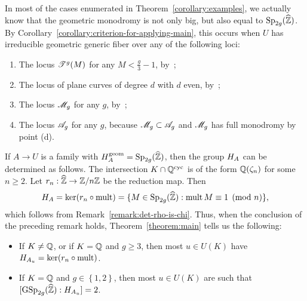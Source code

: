 \begin{remark}
       \label{remark:mmmm}
       In most of the cases enumerated in Theorem~\ref{corollary:examples}, we actually know that the geometric monodromy is not only big, but also equal to $\operatorname{Sp}_{2g}(\widehat{\mathbb Z})$.
       By Corollary~\ref{corollary:criterion-for-applying-main},
       this occurs when $U$ has irreducible geometric generic fiber
       over any of the following loci:
       \begin{enumerate}
               \item The locus $\mathscr T^{g} (M)$ for any $M < \frac{g}{3}-1$, by~\cite[Theorem, p.~2]{bolognesi2016mapping};
               \item The locus of plane curves of degree $d$ with $d$ even, by~\cite[Theoreme 4(i)]{beauville1986groupe};
               \item The locus ${\mathscr M_g}$ for any $g$, by~\cite[5.12]{deligne1969irreducibility};
	       \item The locus ${\mathscr A_g}$ for any $g$, because ${\mathscr M_g} \subset {\mathscr A_g}$ and ${\mathscr M_g}$ has full monodromy by point (d).
       \end{enumerate}
\end{remark}

\begin{remark}
       If $A \to U$ is a family with $H_A^{\operatorname{geom}} = \operatorname{Sp}_{2g}(\widehat{{\mathbb Z}})$, then the group $H_A$ can be determined as follows. The intersection $K \cap {\mathbb Q}^{\operatorname{cyc}}$ is of the form ${\mathbb Q}(\zeta_n)$ for some $n \ge 2$. Let $r_n : \widehat{{\mathbb Z}} \to {\mathbb Z} / n {\mathbb Z}$ be the reduction map. Then
    \[
       H_A = \ker (r_n \circ \operatorname{mult}) = \{M \in \operatorname{Sp}_{2g}(\widehat{{\mathbb Z}}) : \operatorname{mult} M \equiv 1 \pmod{n} \},
    \]
       which follows from Remark~\ref{remark:det-rho-is-chi}.
Thus, when the conclusion of the preceding remark holds, Theorem~\ref{theorem:main} tells us the following:
    \begin{itemize}
           \item If $K\neq {\mathbb Q}$, or if $K = {\mathbb Q}$ and $g \ge 3$, then most $u \in U(K)$ have $H_{A_u} = \ker (r_n \circ \operatorname{mult})$.
	   \item If $K = {\mathbb Q}$ and $g \in \left\{ 1,2 \right\}$, then most $u \in U(K)$ are such that $[\operatorname{GSp}_{2g}(\widehat{{\mathbb Z}}) : H_{A_u}] = 2$.
       \end{itemize}
\end{remark}

